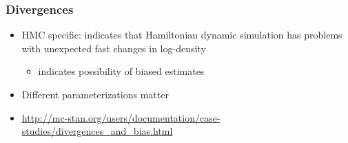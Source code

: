\documentclass[10pt,handout]{beamer}
\begin{document}
\begin{frame}

\frametitle{Divergences}

  \begin{itemize}
  \item HMC specific: indicates that Hamiltonian dynamic simulation
    has problems with unexpected fast changes in log-density
    \begin{itemize}
    \item indicates possibility of biased estimates
    \end{itemize}
  \item Different parameterizations matter
  \item {\small \url{http://mc-stan.org/users/documentation/case-studies/divergences_and_bias.html}}

\end{itemize}
\end{frame}
\end{document}
